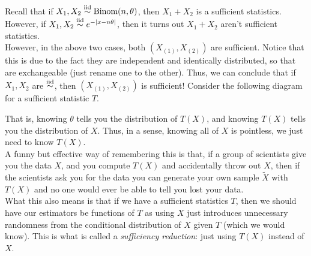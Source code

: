 
Recall that if $X_1, X_2 \overset{\tt{iid}}{\sim} \tt{Binom}(n, \theta)$, then $X_1 + X_2$ is a sufficient statistics. However, if $X_1, X_2 \iidsim e^{-\abs{x - n\theta}}$, then it turns out $X_1 + X_2$ aren't sufficient statistics.\\

However, in the above two cases, both $(X_{(1)}, X_{(2)})$ are sufficient. Notice that this is due to the fact they are independent and identically distributed, so that are exchangeable (just rename one to the other). Thus, we can conclude that if $X_1, X_2$ are $\iidsim$, then $(X_{(1)}, X_{(2)})$ is sufficient! Consider the following diagram for a sufficient statistic $T$. 

\begin{center}
\end{center}
That is, knowing $\theta$ tells you the distribution of $T(X)$, and knowing $T(X)$ tells you the distribution of $X$. Thus, in a sense, knowing all of $X$ is pointless, we just need to know $T(X)$.\\

A funny but effective way of remembering this is that, if a group of scientists give you the data $X$, and you compute $T(X)$ and accidentally throw out $X$, then if the scientists ask you for the data you can generate your own sample $\tilde{X}$ with $T(X)$ and no one would ever be able to tell you lost your data.\\

What this also means is that if we have a sufficient statistics $T$, then we should have our estimators be functions of $T$ as using $X$ just introduces unnecessary randomness from the conditional distribution of $X$ given $T$ (which we would know). This is what is called a \emph{sufficiency reduction}: just using $T(X)$ instead of $X$. 

